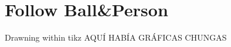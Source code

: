\section{Follow Ball&Person}
 \frame{\sectionpage}
 
\begin{frame}{Drawning within tikz}
   \centering 
   \huge{AQUÍ HABÍA GRÁFICAS CHUNGAS}
\end{frame}